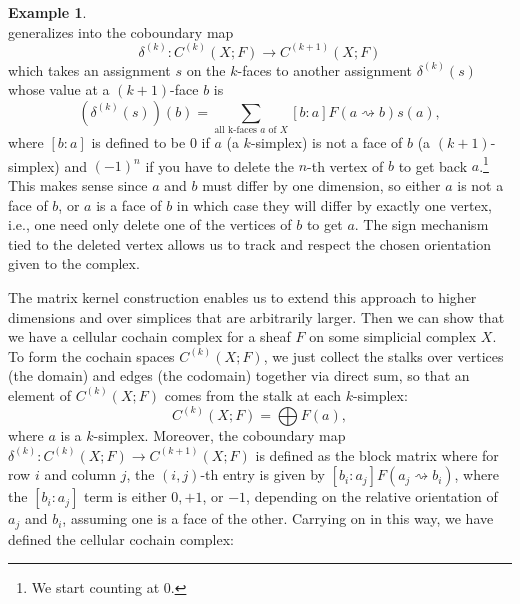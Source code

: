 \documentclass[11pt]{book}
\theoremstyle{definition}
\newtheorem{example}{Example}[section]
\theoremstyle{definition}
\theoremstyle{definition}
\theoremstyle{theorem}
\theoremstyle{definition}
\begin{document}
\begin{example}
\begin{equation*}
  \end{equation*}
  generalizes into the coboundary map 
  \begin{equation*}
  \delta^{(k)}: C^{(k)}(X; F) \rightarrow C^{(k+1)}(X;F)
  \end{equation*}
  which takes an assignment $s$ on the $k$-faces to another assignment $\delta^{(k)}(s)$ whose value at a $(k+1)$-face $b$ is 
  \begin{equation}
  (\delta^{(k)}(s))(b) = \sum_{\text{all k-faces } a \text{ of } X} [b:a] F(a \rightsquigarrow b) s(a),
  \end{equation} 
  where $[b:a]$ is defined to be $0$ if $a$ (a $k$-simplex) is not a face of $b$ (a $(k+1)$-simplex) and $(-1)^n$ if you have to delete the $n$-th vertex of $b$ to get back $a$.\footnote{We start counting at 0.} This makes sense since $a$ and $b$ must differ by one dimension, so either $a$ is not a face of $b$, or $a$ is a face of $b$ in which case they will differ by exactly one vertex, i.e., one need only delete one of the vertices of $b$ to get $a$. The sign mechanism tied to the deleted vertex allows us to track and respect the chosen orientation given to the complex.\par  
 The matrix kernel construction enables us to extend this approach to higher dimensions and over simplices that are arbitrarily larger. Then we can show that we have a cellular cochain complex for a sheaf $F$ on some simplicial complex $X$. To form the cochain spaces $C^{(k)}(X;F)$, we just collect the stalks over vertices (the domain) and edges (the codomain) together via direct sum, so that an element of $C^{(k)}(X;F)$ comes from the stalk at each $k$-simplex: 
	\begin{equation}
	C^{(k)}(X;F) = \bigoplus F(a),
	\end{equation}
	where $a$ is a $k$-simplex. Moreover, the coboundary map $\delta^{(k)}: C^{(k)}(X;F) \rightarrow C^{(k+1)}(X;F)$ is defined as the block matrix where for row $i$ and column $j$, the $(i,j)$-th entry is given by $[b_i: a_j]F(a_j \rightsquigarrow b_i)$, where the $[b_i:a_j]$ term is either $0, +1$, or $-1$, depending on the relative orientation of $a_j$ and $b_i$, assuming one is a face of the other. Carrying on in this way, we have defined the cellular cochain complex: 
	\par 
\end{example}
\end{document}

